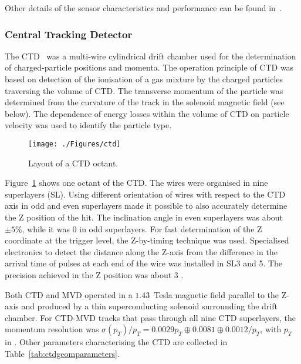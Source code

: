 Other details of the sensor characteristics and performance can be found in~\cite{nim:a581:656,tech:mvd:prc9701,Foster:1993ja}.

\subsubsection{Central Tracking Detector}
\label{subsubsec:ctd}
The CTD~\cite{nim:a283:477,nim:a279:290,npps:b32:181} was a multi-wire cylindrical drift chamber used for the determination of charged-particle positions and momenta. The operation principle of CTD was based on detection of the ionisation of a gas mixture by the charged particles traversing the volume of CTD. The transverse momentum of the particle was determined from the curvature of the track in the solenoid magnetic field (see below). The dependence of energy losses within the volume of CTD on particle velocity was used to identify the particle type.
\begin{figure}[htpb]
	\centering
		\texttt{[image: ./Figures/ctd]}
	\caption{Layout of a CTD octant.}
	\label{fig:ctd}
\end{figure}
Figure~\ref{fig:ctd} shows one octant of the CTD. The wires were organised in nine superlayers (SL). Using different orientation of wires with respect to the CTD axis in odd and even superlayers made it possible to also accurately determine the Z position of the hit. The inclination angle in even superlayers was about $\pm 5\%$, while it was 0 in odd superlayers. For fast determination of the Z coordinate at the trigger level, the Z-by-timing technique was used. Specialised electronics to detect the distance along the Z-axis from the difference in the arrival time of pulses at each end of the wire was installed in SL3 and 5. The precision achieved in the Z position was about 3 \cm.

Both CTD and MVD operated in a $1.43$~Tesla magnetic field parallel to the Z-axis and produced by a thin superconducting solenoid surrounding the drift chamber. For CTD-MVD tracks that pass through all nine CTD superlayers, the momentum resolution was $\sigma(p_{T})/p_{T} = 0.0029 p_{T} \oplus 0.0081 \oplus
0.0012/p_{T}$, with $p_{T}$ in \GeV. Other parameters characterising the CTD are collected in Table~\ref{tab:ctdgeomparameters}.

